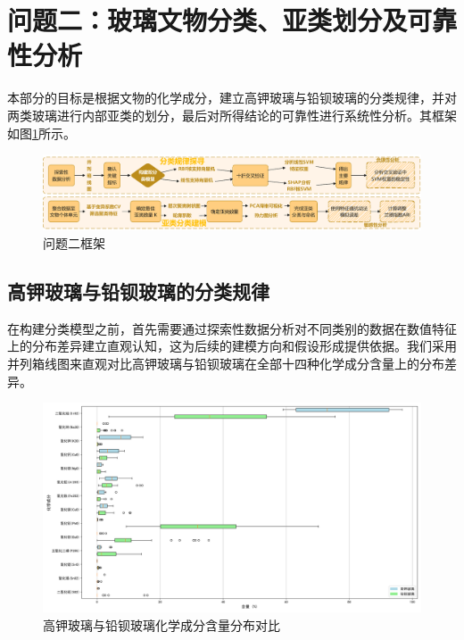 \section{问题二：玻璃文物分类、亚类划分及可靠性分析}

本部分的目标是根据文物的化学成分，建立高钾玻璃与铅钡玻璃的分类规律，并对两类玻璃进行内部亚类的划分，最后对所得结论的可靠性进行系统性分析。其框架如图\ref{fig:problem2_framework}所示。

\begin{figure}[H]
    \centering
    \includegraphics[width=\textwidth]{figs/4问题二/第二问框架.pdf}
    \caption{问题二框架}
    \label{fig:problem2_framework}
\end{figure}

\subsection{高钾玻璃与铅钡玻璃的分类规律}

在构建分类模型之前，首先需要通过探索性数据分析对不同类别的数据在数值特征上的分布差异建立直观认知，这为后续的建模方向和假设形成提供依据。我们采用并列箱线图来直观对比高钾玻璃与铅钡玻璃在全部十四种化学成分含量上的分布差异。

\begin{figure}[H]
    \centering
    \includegraphics[width=\textwidth]{figs/4问题二/EDA_并列箱线图.png}
    \caption{高钾玻璃与铅钡玻璃化学成分含量分布对比}
    \label{fig:eda_boxplot}
\end{figure}

